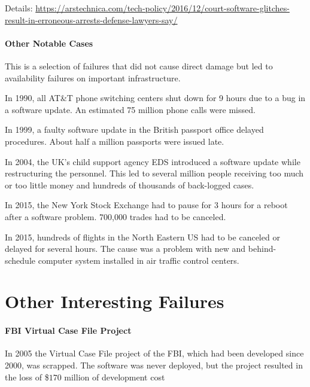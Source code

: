 Details: \url{https://arstechnica.com/tech-policy/2016/12/court-software-glitches-result-in-erroneous-arrests-defense-lawyers-say/}

\paragraph{Other Notable Cases}
This is a selection of failures that did not cause direct damage but led to availability failures on important infrastructure.

In 1990, all AT\&T phone switching centers shut down for 9 hours due to a bug in a software update.
An estimated 75 million phone calls were missed.

In 1999, a faulty software update in the British passport office delayed procedures.
About half a million passports were issued late.

In 2004, the UK's child support agency EDS introduced a software update while restructuring the personnel.
This led to several million people receiving too much or too little money and hundreds of thousands of back-logged cases.

In 2015, the New York Stock Exchange had to pause for $3$ hours for a reboot after a software problem.
700,000 trades had to be canceled.

In 2015, hundreds of flights in the North Eastern US had to be canceled or delayed for several hours.
The cause was a problem with new and behind-schedule computer system installed in air traffic control centers.

\section{Other Interesting Failures}

\paragraph{FBI Virtual Case File Project}
In 2005 the Virtual Case File project of the FBI, which had been developed since 2000, was scrapped.
The software was never deployed, but the project resulted in the loss of \$$170$ million of development cost

